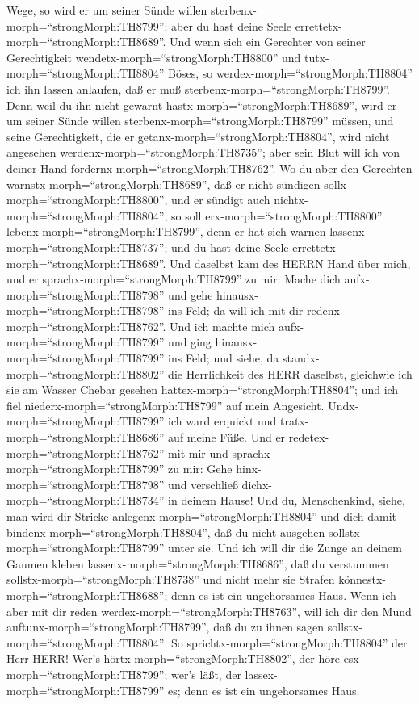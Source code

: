 Wege, so wird er um seiner Sünde willen
sterbenx-morph=``strongMorph:TH8799''; aber du hast deine Seele
errettetx-morph=``strongMorph:TH8689''.  Und wenn sich ein
Gerechter von seiner Gerechtigkeit wendetx-morph=``strongMorph:TH8800''
und tutx-morph=``strongMorph:TH8804'' Böses, so
werdex-morph=``strongMorph:TH8804'' ich ihn lassen anlaufen, daß er muß
sterbenx-morph=``strongMorph:TH8799''. Denn weil du ihn nicht gewarnt
hastx-morph=``strongMorph:TH8689'', wird er um seiner Sünde willen
sterbenx-morph=``strongMorph:TH8799'' müssen, und seine Gerechtigkeit,
die er getanx-morph=``strongMorph:TH8804'', wird nicht angesehen
werdenx-morph=``strongMorph:TH8735''; aber sein Blut will ich von deiner
Hand fordernx-morph=``strongMorph:TH8762''.  Wo du aber den
Gerechten warnstx-morph=``strongMorph:TH8689'', daß er nicht sündigen
sollx-morph=``strongMorph:TH8800'', und er sündigt auch
nichtx-morph=``strongMorph:TH8804'', so soll
erx-morph=``strongMorph:TH8800'' lebenx-morph=``strongMorph:TH8799'',
denn er hat sich warnen lassenx-morph=``strongMorph:TH8737''; und du
hast deine Seele errettetx-morph=``strongMorph:TH8689''. 
Und daselbst kam des HERRN Hand über mich, und er
sprachx-morph=``strongMorph:TH8799'' zu mir: Mache dich
aufx-morph=``strongMorph:TH8798'' und gehe
hinausx-morph=``strongMorph:TH8798'' ins Feld; da will ich mit dir
redenx-morph=``strongMorph:TH8762''.  Und ich machte mich
aufx-morph=``strongMorph:TH8799'' und ging
hinausx-morph=``strongMorph:TH8799'' ins Feld; und siehe, da
standx-morph=``strongMorph:TH8802'' die Herrlichkeit des HERR daselbst,
gleichwie ich sie am Wasser Chebar gesehen
hattex-morph=``strongMorph:TH8804''; und ich fiel
niederx-morph=``strongMorph:TH8799'' auf mein Angesicht. 
Undx-morph=``strongMorph:TH8799'' ich ward erquickt und
tratx-morph=``strongMorph:TH8686'' auf meine Füße. Und er
redetex-morph=``strongMorph:TH8762'' mit mir und
sprachx-morph=``strongMorph:TH8799'' zu mir: Gehe
hinx-morph=``strongMorph:TH8798'' und verschließ
dichx-morph=``strongMorph:TH8734'' in deinem Hause!  Und
du, Menschenkind, siehe, man wird dir Stricke
anlegenx-morph=``strongMorph:TH8804'' und dich damit
bindenx-morph=``strongMorph:TH8804'', daß du nicht ausgehen
sollstx-morph=``strongMorph:TH8799'' unter sie.  Und ich
will dir die Zunge an deinem Gaumen kleben
lassenx-morph=``strongMorph:TH8686'', daß du verstummen
sollstx-morph=``strongMorph:TH8738'' und nicht mehr sie Strafen
könnestx-morph=``strongMorph:TH8688''; denn es ist ein ungehorsames
Haus.  Wenn ich aber mit dir reden
werdex-morph=``strongMorph:TH8763'', will ich dir den Mund
auftunx-morph=``strongMorph:TH8799'', daß du zu ihnen sagen
sollstx-morph=``strongMorph:TH8804'': So
sprichtx-morph=``strongMorph:TH8804'' der Herr HERR! Wer's
hörtx-morph=``strongMorph:TH8802'', der höre
esx-morph=``strongMorph:TH8799''; wer's läßt, der
lassex-morph=``strongMorph:TH8799'' es; denn es ist ein ungehorsames
Haus.

